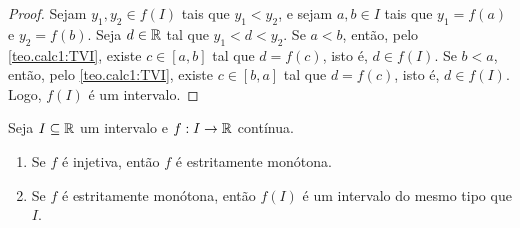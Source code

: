 \begin{proof}
    Sejam $y_1, y_2 \in f(I)$ tais que $y_1 < y_2$, e sejam $a, b \in I$ tais que $y_1 = f(a)$ e $y_2 = f(b)$. Seja $d \in \mathbb{R}$ tal que $y_1<d<y_2$. Se $a < b$, então, pelo \cref{teo.calc1:TVI}, existe $c \in [a,b]$ tal que $d = f(c)$, isto é, $d \in f(I)$. Se $b < a$, então, pelo \cref{teo.calc1:TVI}, existe $c \in [b,a]$ tal que $d = f(c)$, isto é, $d \in f(I)$. Logo, $f(I)$ é um intervalo. \blackproof
\end{proof}

\begin{corollary}
    Seja $I \subseteq \mathbb{R}$ um intervalo e $f : I  \to \mathbb{R}$ contínua.
        \begin{enumerate}[leftmargin=*, align=left, label=\textbf{(\alph*)}]
            \item Se $f$ é injetiva, então $f$ é estritamente monótona.
            \item Se $f$ é estritamente monótona, então $f(I)$ é um intervalo do mesmo tipo que $I$.
        \end{enumerate}
\end{corollary}

